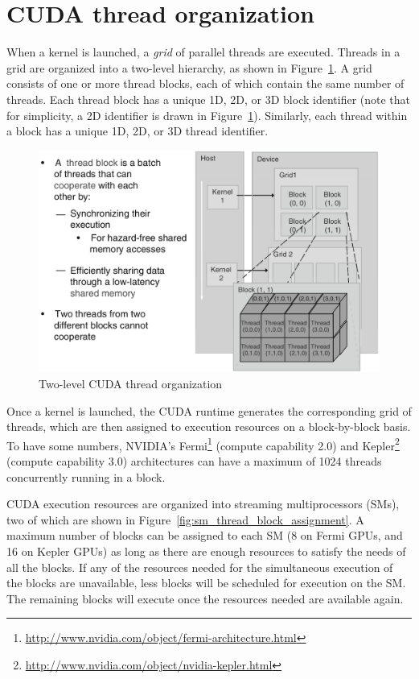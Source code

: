 \documentclass[12pt, a4paper]{report}
\begin{document}
\section{CUDA thread organization}
\label{sec:cuda_thread_organization}
When a kernel is launched, a \emph{grid} of parallel threads are executed.
Threads in a grid are organized into a two-level hierarchy, as shown in
Figure~\ref{fig:cuda_thread_organization}.
A grid consists of one or more thread blocks, each of which contain the same
number of threads.
Each thread block has a unique 1D, 2D, or 3D block identifier (note that for
simplicity, a 2D identifier is drawn in
Figure~\ref{fig:cuda_thread_organization}).
Similarly, each thread within a block has a unique 1D, 2D, or 3D thread
identifier.

\begin{figure}[h]
\centering
\includegraphics[scale=0.27]{figs/cuda_thread_organization}
\caption{Two-level CUDA thread organization}
\label{fig:cuda_thread_organization}
\end{figure}

Once a kernel is launched, the CUDA runtime generates the corresponding grid of
threads, which are then assigned to execution resources on a block-by-block
basis.
To have some numbers, NVIDIA's Fermi\footnote{\url{http://www.nvidia.com/object/fermi-architecture.html}} (compute capability 2.0) and Kepler\footnote{\url{http://www.nvidia.com/object/nvidia-kepler.html}}
(compute capability 3.0) architectures can have a maximum of 1024 threads
concurrently running in a block.

CUDA execution resources are organized into streaming multiprocessors (SMs), two
of which are shown in Figure~\ref{fig:sm_thread_block_assignment}.
A maximum number of blocks can be assigned to each SM (8 on Fermi GPUs, and 16
on Kepler GPUs) as long as there are enough resources to satisfy the needs of
all the blocks.
If any of the resources needed for the simultaneous execution of the blocks are
unavailable, less blocks will be scheduled for execution on the SM.
The remaining blocks will execute once the resources needed are available again.
\end{document}
